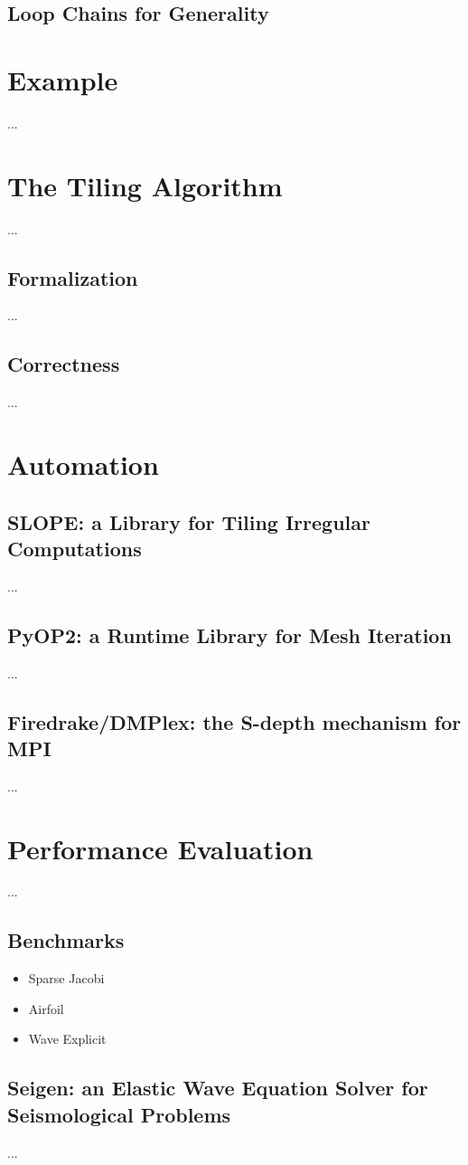 \subsection{Loop Chains for Generality}

\section{Example}
...

\section{The Tiling Algorithm}
...

\subsection{Formalization}
...

\subsection{Correctness}
...


\section{Automation}

\subsection{SLOPE: a Library for Tiling Irregular Computations}
...

\subsection{PyOP2: a Runtime Library for Mesh Iteration}
...

\subsection{Firedrake/DMPlex: the S-depth mechanism for MPI}
...


\section{Performance Evaluation}
...

\subsection{Benchmarks}
\begin{itemize}
\item Sparse Jacobi
\item Airfoil
\item Wave Explicit
\end{itemize}

\subsection{Seigen: an Elastic Wave Equation Solver for Seismological Problems}
\label{sec:tiling:seigen}
...
